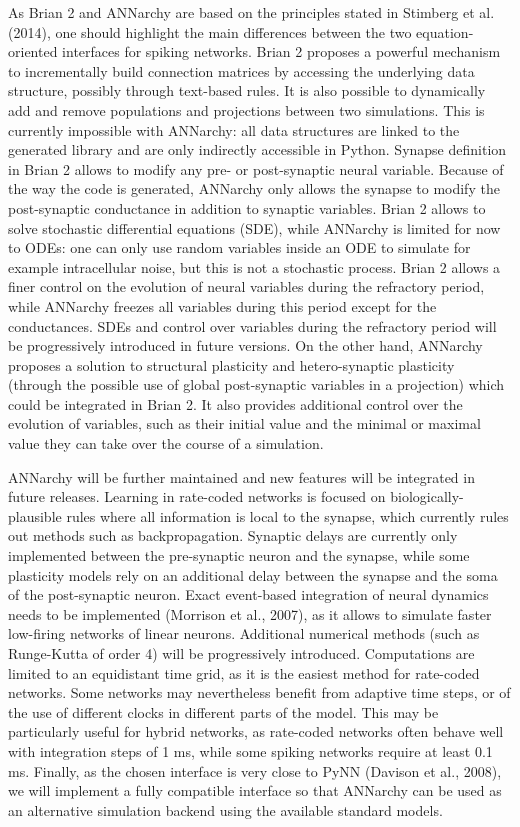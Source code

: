 \documentclass[
  11pt,
  a4paper,
]{scrbook}
\begin{document}
As Brian 2 and ANNarchy are based on the principles stated in Stimberg
et al. (2014), one should highlight the main differences between the two
equation-oriented interfaces for spiking networks. Brian 2 proposes a
powerful mechanism to incrementally build connection matrices by
accessing the underlying data structure, possibly through text-based
rules. It is also possible to dynamically add and remove populations and
projections between two simulations. This is currently impossible with
ANNarchy: all data structures are linked to the generated library and
are only indirectly accessible in Python. Synapse definition in Brian 2
allows to modify any pre- or post-synaptic neural variable. Because of
the way the code is generated, ANNarchy only allows the synapse to
modify the post-synaptic conductance in addition to synaptic variables.
Brian 2 allows to solve stochastic differential equations (SDE), while
ANNarchy is limited for now to ODEs: one can only use random variables
inside an ODE to simulate for example intracellular noise, but this is
not a stochastic process. Brian 2 allows a finer control on the
evolution of neural variables during the refractory period, while
ANNarchy freezes all variables during this period except for the
conductances. SDEs and control over variables during the refractory
period will be progressively introduced in future versions. On the other
hand, ANNarchy proposes a solution to structural plasticity and
hetero-synaptic plasticity (through the possible use of global
post-synaptic variables in a projection) which could be integrated in
Brian 2. It also provides additional control over the evolution of
variables, such as their initial value and the minimal or maximal value
they can take over the course of a simulation.

ANNarchy will be further maintained and new features will be integrated
in future releases. Learning in rate-coded networks is focused on
biologically-plausible rules where all information is local to the
synapse, which currently rules out methods such as backpropagation.
Synaptic delays are currently only implemented between the pre-synaptic
neuron and the synapse, while some plasticity models rely on an
additional delay between the synapse and the soma of the post-synaptic
neuron. Exact event-based integration of neural dynamics needs to be
implemented (Morrison et al., 2007), as it allows to simulate faster
low-firing networks of linear neurons. Additional numerical methods
(such as Runge-Kutta of order 4) will be progressively introduced.
Computations are limited to an equidistant time grid, as it is the
easiest method for rate-coded networks. Some networks may nevertheless
benefit from adaptive time steps, or of the use of different clocks in
different parts of the model. This may be particularly useful for hybrid
networks, as rate-coded networks often behave well with integration
steps of 1 ms, while some spiking networks require at least 0.1 ms.
Finally, as the chosen interface is very close to PyNN (Davison et al.,
2008), we will implement a fully compatible interface so that ANNarchy
can be used as an alternative simulation backend using the available
standard models.
\end{document}

